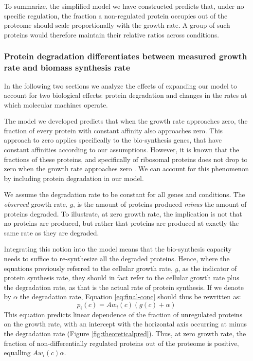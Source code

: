 \documentclass{article}
\begin{document}
To summarize, the simplified model we have constructed predicts that, under no specific regulation, the fraction a non-regulated protein occupies out of the proteome should scale proportionally with the growth rate.
A group of such proteins would therefore maintain their relative ratios across conditions.

\subsubsection{Protein degradation differentiates between measured growth rate and biomass synthesis rate}
\label{degradation}
In the following two sections we analyze the effects of expanding our model to account for two biological effects: protein degradation and changes in the rates at which molecular machines operate.

The model we developed predicts that when the growth rate approaches zero, the fraction of every protein with constant affinity also approaches zero.
This approach to zero applies specifically to the bio-synthesis genes, that have constant affinities according to our assumptions.
However, it is known that the fractions of these proteins, and specifically of ribosomal proteins does not drop to zero when the growth rate approaches zero \cite{ingraham1983growth,Pedersen1978a}.
We can account for this phenomenon by including protein degradation in our model.

We assume the degradation rate to be constant for all genes and conditions.
The \emph{observed} growth rate, $g$, is the amount of proteins produced \emph{minus} the amount of proteins degraded.
To illustrate, at zero growth rate, the implication is not that no proteins are produced, but rather that proteins are produced at exactly the same rate as they are degraded.

Integrating this notion into the model means that the bio-synthesis capacity needs to suffice to re-synthesize all the degraded proteins.
Hence, where the equations previously referred to the cellular growth rate, $g$, as the indicator of protein synthesis rate, they should in fact refer to the cellular growth rate plus the degradation rate, as that is the actual rate of protein synthesis.
If we denote by $\alpha$ the degradation rate, Equation \ref{eq:final-conc} should thus be rewritten as:
\begin{equation}
  \label{eq:final-conc-deg}
  p_i(c)=Aw_i(c)(g(c)+\alpha)
\end{equation}
This equation predicts linear dependence of the fraction of unregulated proteins on the growth rate, with an intercept with the horizontal axis occurring at minus the degradation rate (Figure \ref{fig:theoreticalpred}).
Thus, at zero growth rate, the fraction of non-differentially regulated proteins out of the proteome is positive, equalling $Aw_i(c)\alpha$.
\end{document}
